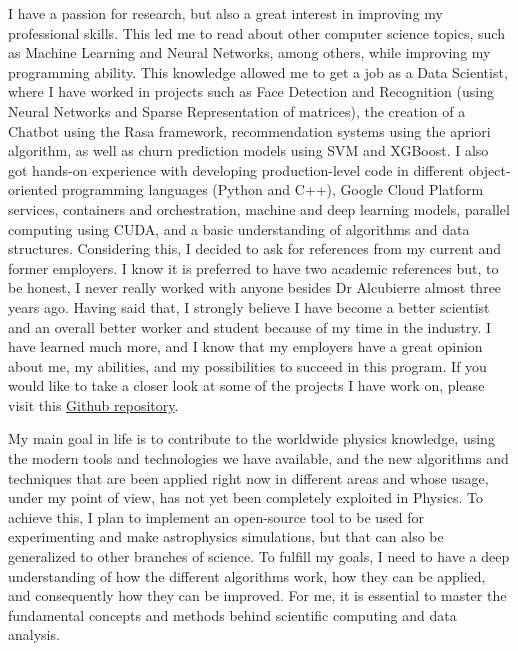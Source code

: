 \documentclass{article}
\begin{document}
I have a passion for research, but also a great interest in improving my professional skills. This led me to read about other computer science topics, such as Machine Learning and Neural Networks, among others, while improving my programming ability. This knowledge allowed me to get a job as a Data Scientist, where I have worked in projects such as Face Detection and Recognition (using Neural Networks and Sparse Representation of matrices), the creation of a Chatbot using the Rasa framework, recommendation systems using the apriori algorithm, as well as churn prediction models using SVM and XGBoost. I also got hands-on experience with developing production-level code in different object-oriented programming languages (Python and C++), Google Cloud Platform services, containers and orchestration, machine and deep learning models, parallel computing using CUDA, and a basic understanding of algorithms and data structures. Considering this, I decided to ask for references from my current and former employers. I know it is preferred to have two academic references but, to be honest, I never really worked with anyone besides Dr Alcubierre almost three years ago. Having said that, I strongly believe I have become a better scientist and an overall better worker and student because of my time in the industry. I have learned much more, and I know that my employers have a great opinion about me, my abilities, and my possibilities to succeed in this program. If you would like to take a closer look at some of the projects I have work on, please visit this \href{https://github.com/uzmargomez/master_degree}{Github repository}. 

My main goal in life is to contribute to the worldwide physics knowledge, using the modern tools and technologies we have available, and the new algorithms and techniques that are been applied right now in different areas and whose usage, under my point of view, has not yet been completely exploited in Physics. To achieve this, I plan to implement an open-source tool to be used for experimenting and make astrophysics simulations, but that can also be generalized to other branches of science. To fulfill my goals, I need to have a deep understanding of how the different algorithms work, how they can be applied, and consequently how they can be improved. For me, it is essential to master the fundamental concepts and methods behind scientific computing and data analysis.
\end{document}

